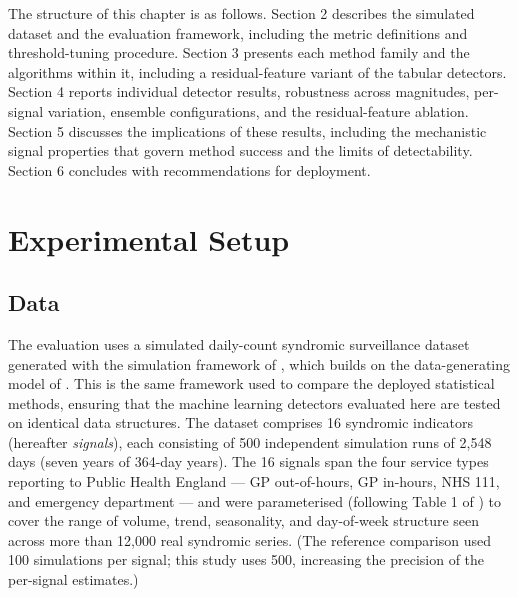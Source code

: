 \documentclass[11pt]{article}
\begin{document}
The structure of this chapter is as follows. Section 2 describes the simulated dataset and the evaluation framework, including the metric definitions and threshold-tuning procedure. Section 3 presents each method family and the algorithms within it, including a residual-feature variant of the tabular detectors. Section 4 reports individual detector results, robustness across magnitudes, per-signal variation, ensemble configurations, and the residual-feature ablation. Section 5 discusses the implications of these results, including the mechanistic signal properties that govern method success and the limits of detectability. Section 6 concludes with recommendations for deployment.


\section{Experimental Setup}

\subsection{Data}

The evaluation uses a simulated daily-count syndromic surveillance dataset generated with the simulation framework of \citet{noufaily2019}, which builds on the data-generating model of \citet{noufaily2013}. This is the same framework used to compare the deployed statistical methods, ensuring that the machine learning detectors evaluated here are tested on identical data structures. The dataset comprises 16 syndromic indicators (hereafter \textit{signals}), each consisting of 500 independent simulation runs of 2,548 days (seven years of 364-day years). The 16 signals span the four service types reporting to Public Health England --- GP out-of-hours, GP in-hours, NHS 111, and emergency department --- and were parameterised (following Table 1 of \citealp{noufaily2019}) to cover the range of volume, trend, seasonality, and day-of-week structure seen across more than 12,000 real syndromic series. (The reference comparison used 100 simulations per signal; this study uses 500, increasing the precision of the per-signal estimates.)
\end{document}
